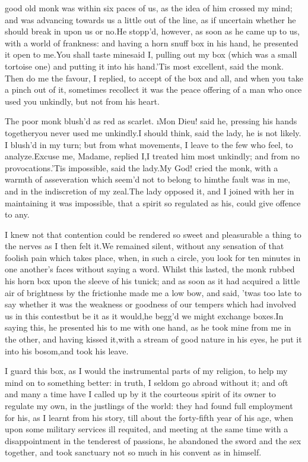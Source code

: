 \documentclass[twoside]{article}
\begin{document}


 good old monk was within six paces of us, as the idea of him crossed
my mind; and was advancing towards us a little out of the line, as if
uncertain whether he should break in upon us or no.\tsk He stopp’d, however,
as soon as he came up to us, with a world of frankness: and having a horn
snuff box in his hand, he presented it open to me.\tsk You shall taste
mine\tsk said I, pulling out my box (which was a small tortoise one) and
putting it into his hand.\tsk ’Tis most excellent, said the monk.  Then do me
the favour, I replied, to accept of the box and all, and when you take a
pinch out of it, sometimes recollect it was the peace offering of a man
who once used you unkindly, but not from his heart.

The poor monk blush’d as red as scarlet.  \i{Mon Dieu}! said he, pressing
his hands together\tsk you never used me unkindly.\tsk I should think, said the
lady, he is not likely.  I blush’d in my turn; but from what movements, I
leave to the few who feel, to analyze.\tsk Excuse me, Madame, replied I,\tsk I
treated him most unkindly; and from no provocations.\tsk ’Tis impossible,
said the lady.\tsk My God! cried the monk, with a warmth of asseveration
which seem’d not to belong to him\tsk the fault was in me, and in the
indiscretion of my zeal.\tsk The lady opposed it, and I joined with her in
maintaining it was impossible, that a spirit so regulated as his, could
give offence to any.

I knew not that contention could be rendered so sweet and pleasurable a
thing to the nerves as I then felt it.\tsk We remained silent, without any
sensation of that foolish pain which takes place, when, in such a circle,
you look for ten minutes in one another’s faces without saying a word.
Whilst this lasted, the monk rubbed his horn box upon the sleeve of his
tunick; and as soon as it had acquired a little air of brightness by the
friction\tsk he made me a low bow, and said, ’twas too late to say whether it
was the weakness or goodness of our tempers which had involved us in this
contest\tsk but be it as it would,\tsk he begg’d we might exchange boxes.\tsk In
saying this, he presented his to me with one hand, as he took mine from
me in the other, and having kissed it,\tsk with a stream of good nature in
his eyes, he put it into his bosom,\tsk and took his leave.

I guard this box, as I would the instrumental parts of my religion, to
help my mind on to something better: in truth, I seldom go abroad without
it; and oft and many a time have I called up by it the courteous spirit
of its owner to regulate my own, in the justlings of the world: they had
found full employment for his, as I learnt from his story, till about the
forty-fifth year of his age, when upon some military services ill
requited, and meeting at the same time with a disappointment in the
tenderest of passions, he abandoned the sword and the sex together, and
took sanctuary not so much in his convent as in himself.
\end{document}

